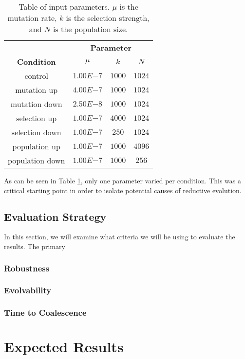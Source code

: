 \begin{table}[h]
	\centering
	\begin{tabular}{|c||c|c|c|}
		\hline
		 & \multicolumn{3}{c|}{\textbf{Parameter}} \\
		\cline{2-4}
		\textbf{Condition} &$\mu$ & $k$ & $N$ \\
		\hline
		control & $1.00E{-7}$ & $1000$ & $1024$ \\
		\hline
		mutation up & $4.00E{-7}$ & $1000$ & $1024$ \\
		\hline
		mutation down & $2.50E{-8}$ & $1000$ & $1024$ \\
		\hline
		selection up & $1.00E{-7}$ & $4000$ & $1024$ \\
		\hline
		selection down & $1.00E{-7}$ & $250$ & $1024$ \\
		\hline
		population up & $1.00E{-7}$ & $1000$ & $4096$ \\
		\hline
		population down & $1.00E{-7}$ & $1000$ & $256$ \\		
		\hline
	\end{tabular}
	\caption[Table of parameters]{Table of input parameters. $\mu$ is the mutation rate, $k$ is the selection strength, and $N$ is the population size.}
	\label{table:parameters}
\end{table}
As can be seen in Table \ref{table:parameters}, only one parameter varied per condition. This was a critical starting point in order to isolate potential causes of reductive evolution. 
\subsection{Evaluation Strategy}
In this section, we will examine what criteria we will be using to evaluate the results. The primary 
\subsubsection{Robustness}
\subsubsection{Evolvability}
\subsubsection{Time to Coalescence}

\section{Expected Results}





